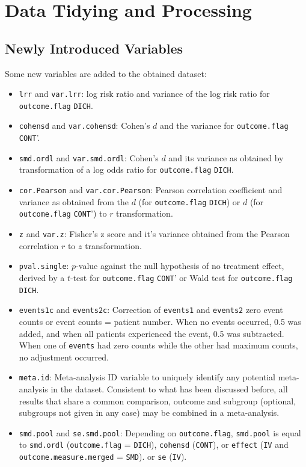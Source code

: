 \documentclass[11pt,a4paper,twoside]{book}\usepackage[]{graphicx}\usepackage[]{color}
\begin{document}
\section{Data Tidying and Processing} \label{sec:Processing}

\subsection{Newly Introduced Variables}
Some new variables are added to the obtained dataset:
\begin{itemize}
\item \texttt{lrr} and \texttt{var.lrr}: log risk ratio and variance of the log risk ratio for \texttt{outcome.flag} \texttt{DICH}.
\item \texttt{cohensd} and \texttt{var.cohensd}: Cohen's $d$ and the variance for \texttt{outcome.flag} \texttt{CONT}'. 
\item \texttt{smd.ordl} and \texttt{var.smd.ordl}: Cohen's $d$ and its variance as obtained by transformation of a log odds ratio for \texttt{outcome.flag} \texttt{DICH}.
\item \texttt{cor.Pearson} and \texttt{var.cor.Pearson}: Pearson correlation coefficient and variance as obtained from the $d$ (for \texttt{outcome.flag} \texttt{DICH}) or $d$ (for \texttt{outcome.flag} \texttt{CONT}') to $r$ transformation.
\item \texttt{z} and \texttt{var.z}: Fisher's z score and it's variance obtained from the Pearson correlation $r$ to $z$ transformation.
\item \texttt{pval.single}: $p$-value against the null hypothesis of no treatment effect, derived by a $t$-test for \texttt{outcome.flag} \texttt{CONT}' or Wald test for \texttt{outcome.flag} \texttt{DICH}.
\item \texttt{events1c} and \texttt{events2c}: Correction of \texttt{events1} and \texttt{events2} zero event counts or event counts = patient number. When no events occurred, 0.5 was added, and when all patients experienced the event, 0.5 was subtracted. When one of \texttt{events} had zero counts while the other had maximum counts, no adjustment occurred.
\item \texttt{meta.id}: Meta-analysis ID variable to uniquely identify any potential meta-analysis in the dataset. Consistent to what has been discussed before, all results that share a common comparison, outcome and subgroup (optional, subgroups not given in any case) may be combined in a meta-analysis.
\item \texttt{smd.pool} and \texttt{se.smd.pool}: Depending on \texttt{outcome.flag}, \texttt{smd.pool} is equal to \texttt{smd.ordl} (\texttt{outcome.flag} = \texttt{DICH}), \texttt{cohensd} (\texttt{CONT}), or \texttt{effect} (\texttt{IV} and \texttt{outcome.measure.merged} = \texttt{SMD}).
or \texttt{se} (\texttt{IV}).
\end{itemize}
\end{document}
